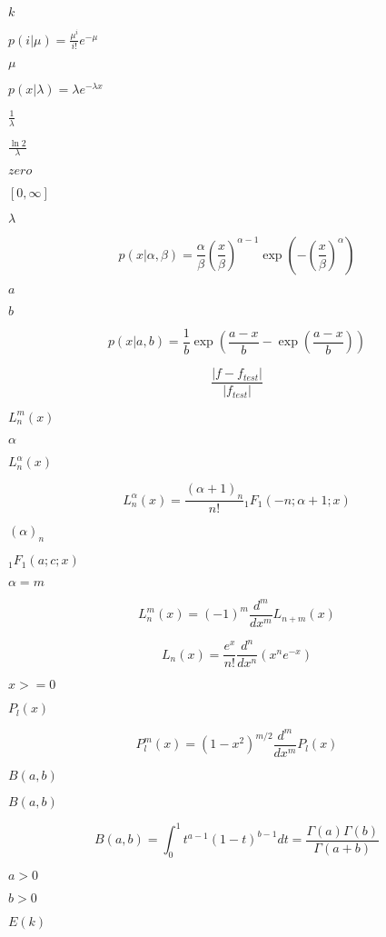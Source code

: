 \documentclass{article}
\begin{document}
$k$
\pagebreak

$p(i|\mu) = \frac{\mu^i}{i!} e^{-\mu}$
\pagebreak

$\mu$
\pagebreak

$p(x|\lambda) = \lambda e^{-\lambda x}$
\pagebreak

$\frac{1}{\lambda}$
\pagebreak

$\frac{\ln 2}{\lambda}$
\pagebreak

$zero$
\pagebreak

$[0, \infty]$
\pagebreak

$\lambda$
\pagebreak

\[
    p(x|\alpha,\beta) = \frac{\alpha}{\beta} (\frac{x}{\beta})^{\alpha-1}
                        \exp{(-(\frac{x}{\beta})^\alpha)} 
\]
\pagebreak

$a$
\pagebreak

$b$
\pagebreak

\[
    p(x|a,b) = \frac{1}{b}
               \exp( \frac{a-x}{b} - \exp(\frac{a-x}{b})) 
\]
\pagebreak

\[
  \frac{|f - f_{test}|}{|f_{test}|}
\]
\pagebreak

$ L_n^m(x) $
\pagebreak

$ \alpha $
\pagebreak

$ L_n^\alpha(x) $
\pagebreak

\[
     L_n^\alpha(x) = \frac{(\alpha + 1)_n}{n!}
             {}_1F_1(-n; \alpha + 1; x)
\]
\pagebreak

$ (\alpha)_n $
\pagebreak

$ {}_1F_1(a; c; x) $
\pagebreak

$ \alpha = m $
\pagebreak

\[
     L_n^m(x) = (-1)^m \frac{d^m}{dx^m} L_{n + m}(x)
\]
\pagebreak

\[
     L_n(x) = \frac{e^x}{n!} \frac{d^n}{dx^n} (x^ne^{-x})
\]
\pagebreak

$ x >= 0 $
\pagebreak

$ P_l(x) $
\pagebreak

\[
  P_l^m(x) = (1 - x^2)^{m/2}\frac{d^m}{dx^m}P_l(x)
\]
\pagebreak

$ B(a,b) $
\pagebreak

$B(a,b)$
\pagebreak

\[
  B(a,b) = \int_0^1 t^{a - 1} (1 - t)^{b - 1} dt
         = \frac{\Gamma(a)\Gamma(b)}{\Gamma(a+b)}
\]
\pagebreak

$ a > 0 $
\pagebreak

$ b > 0 $
\pagebreak

$ E(k) $
\pagebreak
\end{document}
